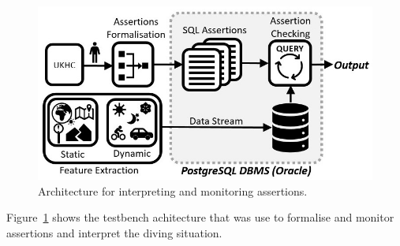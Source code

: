 \begin{figure}[!ht]
    \centering
    \includegraphics[width=0.98\linewidth]{../other/figures/SimulatorAssertionsCondensed.jpg}
    \caption{Architecture for interpreting and monitoring assertions.}
    \label{fig:SimulatorArchitecture}
\end{figure}



Figure~\ref{fig:SimulatorArchitecture} shows the testbench achitecture that was use to formalise and monitor assertions and interpret the diving situation.








